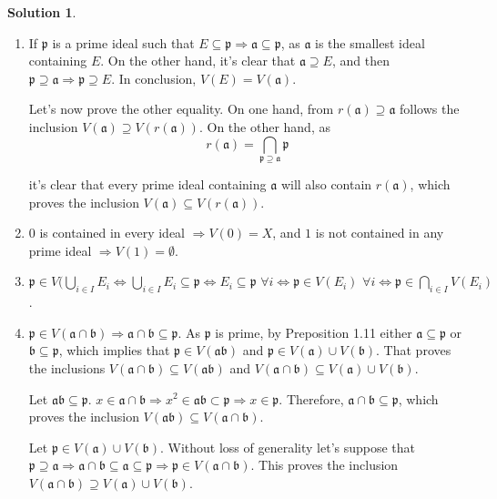 \documentclass[12pt]{article}
\newcommand{\imp}{\ensuremath{\Rightarrow}}
\newcommand{\ip}{\ensuremath{\mathfrak{p}}}
\newcommand{\ia}{\ensuremath{\mathfrak{a}}}
\newcommand{\ib}{\ensuremath{\mathfrak{b}}}
\theoremstyle{definition}
\newtheorem*{sol}{Solution}
\begin{document}
\begin{sol}
	\begin{enumerate}[label=(\roman*)]
		\item If $\mathfrak{p}$ is a prime ideal such that $E \subseteq \mathfrak{p} \imp \mathfrak{a} \subseteq \mathfrak{p}$, as $\mathfrak{a}$ is the smallest ideal containing $E$. On the other hand, it's clear that $\mathfrak{a} \supseteq E$, and then $\mathfrak{p} \supseteq \mathfrak{a} \imp \mathfrak{p} \supseteq E$. In conclusion, $V(E) = V(\mathfrak{a})$.

		Let's now prove the other equality. On one hand, from $r(\mathfrak{a}) \supseteq \mathfrak{a}$ follows the inclusion $V(\mathfrak{a}) \supseteq V(r(\mathfrak{a}))$. On the other hand, as 
		\[
			r(\mathfrak{a}) = \bigcap_{\mathfrak{p} \supseteq \mathfrak{a}} \mathfrak{p}
		\]

		it's clear that every prime ideal containing $\mathfrak{a}$ will also contain $r(\mathfrak{a})$, which proves the inclusion $V(\mathfrak{a}) \subseteq V(r(\mathfrak{a}))$.

		\item $0$ is contained in every ideal $\imp V(0) = X$, and $1$ is not contained in any prime ideal $\imp V(1) = \emptyset$.

		\item $\ip \in V(\bigcup_{i \in I} E_i \iff \bigcup_{i \in I} E_i \subseteq \ip \iff E_i \subseteq \ip \, \, \forall i \iff \ip \in V(E_i) \, \, \forall i \iff \ip \in \bigcap_{i \in I} V(E_i)$.

		\item $\ip \in V(\ia \cap \ib) \imp \ia \cap \ib \subseteq \ip$. As $\ip$ is prime, by Preposition 1.11 either $\ia \subseteq \ip$ or $\ib \subseteq \ip$, which implies that $\ip \in V(\ia \ib)$ and $\ip \in V(\ia) \cup V(\ib)$. That proves the inclusions $V(\ia \cap \ib) \subseteq V(\ia \ib)$ and $V(\ia \cap \ib) \subseteq V(\ia) \cup V(\ib)$.

		Let $\ia \ib \subseteq \ip$. $x \in \ia \cap \ib \imp x^2 \in \ia \ib \subset \ip \imp x \in \ip$. Therefore, $\ia \cap \ib \subseteq \ip$, which proves the inclusion $V(\ia \ib) \subseteq V(\ia \cap \ib)$.

		Let $\ip \in V(\ia) \cup V(\ib)$. Without loss of generality let's suppose that $\ip \supseteq \ia \imp \ia \cap \ib \subseteq  \ia \subseteq \ip \imp \ip \in V(\ia \cap \ib)$. This proves the inclusion $V(\ia \cap \ib) \supseteq V(\ia) \cup V(\ib)$.

	\end{enumerate}
\end{sol}
\end{document}
